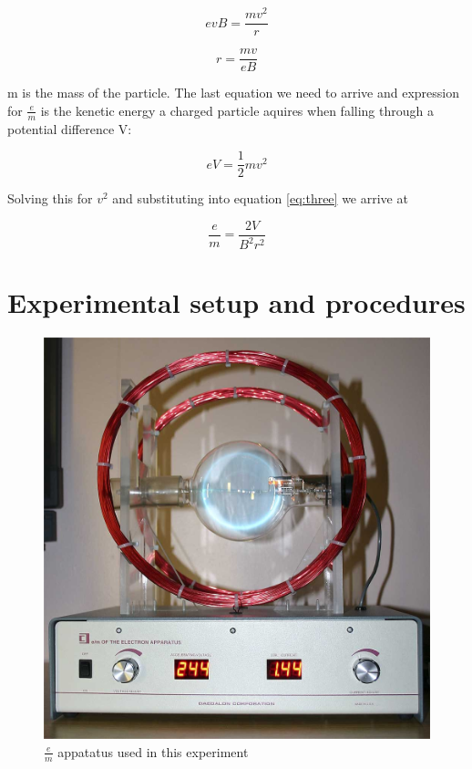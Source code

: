 \documentclass[twocolumn,secnumarabic,amssymb, nobibnotes, aps, pra]{revtex4}
\begin{document}
\begin{equation}
evB = \frac{mv^2}{r}
\label{eq:two}  
\end{equation}

\begin{equation}
r = \frac{mv}{eB}
\label{eq:three}  
\end{equation}

m is the mass of the particle.  The last equation we need to arrive and expression for $\frac{e}{m}$ is the kenetic energy a charged particle aquires when falling through a potential difference V:

\begin{equation}
eV = \frac{1}{2}mv^2
\label{eq:four}  
\end{equation}

Solving this for $v^2$ and substituting into equation \ref{eq:three} we arrive at

\begin{equation}
\frac{e}{m} = \frac{2V}{B^2r^2}
\label{eq:em}  
\end{equation}


\section{Experimental setup and procedures}

\begin{figure}[t]
\begin{center}
\includegraphics[scale=.2]{e_over_m.jpg}
\end{center}
\caption{$\frac{e}{m}$ appatatus used in this experiment}
\label{fig:setup}
\end{figure}
\end{document}
